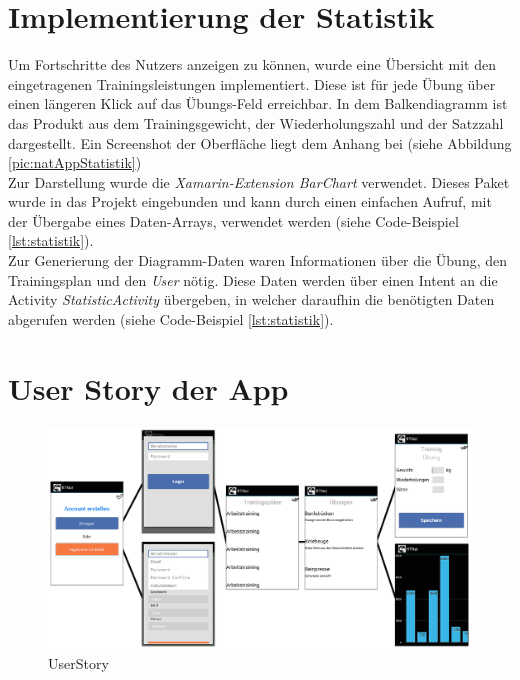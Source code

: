 \section{Implementierung der Statistik}
\label{sec:implementierung-statistik}
Um Fortschritte des Nutzers anzeigen zu können, wurde eine Übersicht mit den eingetragenen Trainingsleistungen implementiert. Diese ist für jede Übung über einen längeren Klick auf das Übungs-Feld erreichbar. In dem Balkendiagramm ist das Produkt aus dem Trainingsgewicht, der Wiederholungszahl und der Satzzahl dargestellt. Ein Screenshot der Oberfläche liegt dem Anhang bei (siehe Abbildung \ref{pic:natAppStatistik})\\
Zur Darstellung wurde die \textit{Xamarin-Extension BarChart} verwendet. Dieses Paket  wurde in das Projekt eingebunden und kann durch einen einfachen Aufruf, mit der Übergabe eines Daten-Arrays, verwendet werden (siehe Code-Beispiel \ref{lst:statistik}).\\
Zur Generierung der Diagramm-Daten waren Informationen über die Übung, den Trainingsplan und den \textit{User} nötig. Diese Daten werden über einen Intent an die Activity  \textit{StatisticActivity} übergeben, in welcher daraufhin die benötigten Daten abgerufen werden (siehe Code-Beispiel \ref{lst:statistik}).


\section{User Story der App}
\label{sec:user-story}
\begin{figure}[!htbp]
\centering
\includegraphics[width=\textwidth, angle={90}]{content/images/UserStory}
\caption{\gls{UserStory}}
\label{pic:UserStory}
\end{figure}

